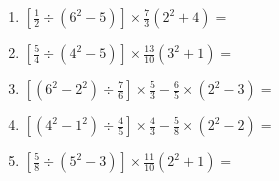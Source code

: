 \documentclass[12pt]{article}
\begin{document}
\begin{enumerate}[ itemsep=1.5cm]
	\item $\displaystyle \left[ \frac{1}{2} \div \left( 6^2 - 5 \right) \right] \times \frac{7}{3} \left( 2^2 + 4 \right) =$
	\item $\displaystyle \left[ \frac{5}{4} \div \left( 4^2 - 5 \right) \right] \times \frac{13}{10} \left( 3^2 + 1 \right) =$
	\item $\displaystyle \left[ \left( 6^2 - 2^2 \right) \div \frac{7}{6} \right] \times \frac{5}{3} - \frac{6}{5} \times \left( 2^2 - 3 \right) =$
	\item $\displaystyle \left[ \left( 4^2 - 1^2 \right) \div \frac{4}{5} \right] \times \frac{4}{3} - \frac{5}{8} \times \left( 2^2 - 2 \right) =$
	\item $\displaystyle \left[ \frac{5}{8} \div \left( 5^2 - 3 \right) \right] \times \frac{11}{10} \left( 2^2 + 1 \right) =$
\end{enumerate}
\end{document}
